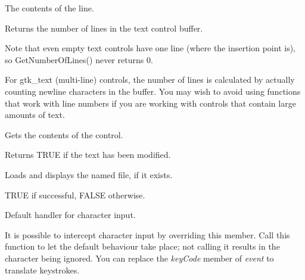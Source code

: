The contents of the line.

\label{wxtextctrlgetnumberoflines}


Returns the number of lines in the text control buffer.


Note that even empty text controls have one line (where the insertion point
is), so GetNumberOfLines() never returns 0.

For gtk\_text (multi-line) controls, the number of lines is
calculated by actually counting newline characters in the buffer. You
may wish to avoid using functions that work with line numbers if you are
working with controls that contain large amounts of text.

\label{wxtextctrlgetvalue}


Gets the contents of the control.

\label{wxtextctrlismodified}


Returns TRUE if the text has been modified.

\label{wxtextctrlloadfile}


Loads and displays the named file, if it exists.




TRUE if successful, FALSE otherwise.

\label{wxtextctrlonchar}


Default handler for character input.


It is possible to intercept character
input by overriding this member. Call this function
to let the default behaviour take place; not calling
it results in the character being ignored. You can
replace the {\it keyCode} member of {\it event} to
translate keystrokes.

